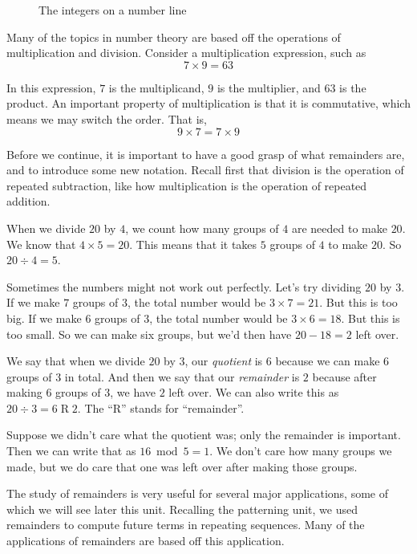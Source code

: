 \documentclass[a4paper,10pt]{report}
\begin{document}
\begin{figure}

 \caption{The integers on a number line}
 \label{nt-int:inumberline}
\end{figure}

Many of the topics in number theory are based off the operations of
multiplication and division. Consider a multiplication expression, such as \[ 7
\times 9 = 63 \]

In this expression, $7$ is the \gls{multiplicand}, $9$ is the \gls{multiplier},
and $63$ is the \gls{product}. An important property of multiplication is that
it is commutative, which means we may switch the order. That is, \[ 9 \times 7 =
7 \times 9 \]

Before we continue, it is important to have a good grasp of what remainders are,
and to introduce some new notation. Recall first that division is the operation
of repeated subtraction, like how multiplication is the operation of repeated
addition.

When we divide $20$ by $4$, we count how many groups of $4$ are needed to make
$20$. We know that $4 \times 5 = 20$. This means that it takes $5$ groups of $4$
to make $20$. So $20 \div 4 = 5$.

Sometimes the numbers might not work out perfectly. Let's try dividing $20$ by
$3$. If we make $7$ groups of $3$, the total number would be $3 \times 7 = 21$.
But this is too big. If we make $6$ groups of $3$, the total number would be $3
\times 6 = 18$. But this is too small. So we can make six groups, but we'd then
have $20 - 18 = 2$ left over.

We say that when we divide $20$ by $3$, our \emph{quotient} is $6$ because we
can make $6$ groups of $3$ in total. And then we say that our \emph{remainder}
is $2$ because after making $6$ groups of $3$, we have $2$ left over. We can
also write this as $20 \div 3 = 6 \operatorname{R} 2$. The ``R'' stands for
``remainder''.

Suppose we didn't care what the quotient was; only the remainder is important.
Then we can write that as $16 \bmod 5 = 1$. We don't care how many groups we
made, but we do care that one was left over after making those groups.

The study of remainders is very useful for several major applications, some of
which we will see later this unit. Recalling the patterning unit, we used
remainders to compute future terms in repeating sequences. Many of the
applications of remainders are based off this application.
\end{document}
